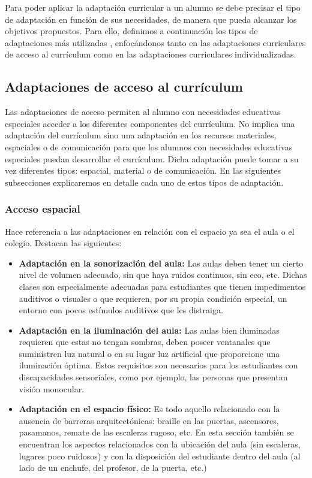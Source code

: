 Para poder aplicar la adaptación curricular a un alumno se debe precisar el tipo de adaptación en función de sus necesidades, de manera que pueda alcanzar los objetivos propuestos. Para ello, definimos a continuación los tipos de adaptaciones más utilizadas \citep*{adaptacionUNED}, enfocándonos tanto en las adaptaciones curriculares de acceso al currículum como en las adaptaciones curriculares individualizadas.
\newline

\subsection{Adaptaciones de acceso al currículum}
\label{adaptacionesAcceso}
Las adaptaciones de acceso permiten al alumno con necesidades educativas especiales acceder a los diferentes componentes del currículum. No implica una adaptación del currículum sino una adaptación en los recursos materiales, espaciales o de comunicación para que los alumnos con necesidades educativas especiales puedan desarrollar el currículum. Dicha adaptación puede tomar a su vez diferentes tipos: espacial, material o de comunicación. En las siguientes subsecciones explicaremos en detalle cada uno de estos tipos de adaptación.

\subsubsection{Acceso espacial}
Hace referencia a las adaptaciones en relación con el espacio ya sea el aula o el colegio. Destacan las siguientes:
\begin{itemize}
    \item \textbf{Adaptación en la sonorización del aula:} Las aulas deben tener un cierto nivel de volumen adecuado, sin que haya ruidos continuos, sin eco, etc. Dichas clases son especialmente adecuadas para estudiantes que tienen impedimentos auditivos o visuales o que requieren, por su propia condición especial, un entorno con pocos estímulos auditivos que les distraiga.
    \item \textbf{Adaptación en la iluminación del aula:} Las aulas bien iluminadas requieren que estas no tengan sombras, deben poseer ventanales que suministren luz natural o en su lugar luz artificial que proporcione una iluminación óptima. Estos requisitos son necesarios para los estudiantes con discapacidades sensoriales, como por ejemplo, las personas que presentan visión monocular.
    \item \textbf{Adaptación en el espacio físico:} Es todo aquello relacionado con la ausencia de barreras arquitectónicas:  braille en las puertas, ascensores, pasamanos, remate de las escaleras rugoso, etc. En esta sección también se encuentran los aspectos relacionados con la ubicación del aula (sin escaleras, lugares poco ruidosos) y con la disposición del estudiante dentro del aula (al lado de un enchufe, del profesor, de la puerta, etc.)
\end{itemize}


